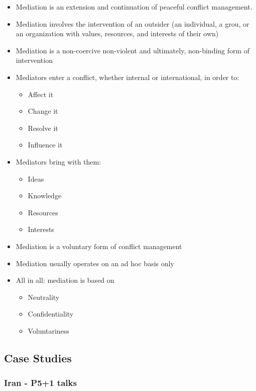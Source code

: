 \begin{itemize}
    \item Mediation is an extension and continuation of peaceful conflict
        management.
    \item Mediation involves the intervention of an outsider (an individual,
        a grou, or an organization with values, resources, and interests
        of their own)
    \item Mediation is a non-coercive non-violent and ultimately, non-binding
        form of intervention
    \item Mediators enter a conflict, whether internal or international,
        in order to:
        \begin{itemize}
            \item Affect it
            \item Change it
            \item Resolve it
            \item Influence it
        \end{itemize}
    \item Mediators bring with them:
        \begin{itemize}
            \item Ideas
            \item Knowledge
            \item Resources
            \item Interests
        \end{itemize}
    \item Mediation is a voluntary form of conflict management
    \item Mediation usually operates on an ad hoc basis only
    \item All in all: mediation is based on
        \begin{itemize}
            \item Neutrality
            \item Confidentiality
            \item Voluntariness
        \end{itemize}
\end{itemize}

\pagebreak

\subsection{Case Studies}

\subsubsection{Iran - P5+1 talks}


